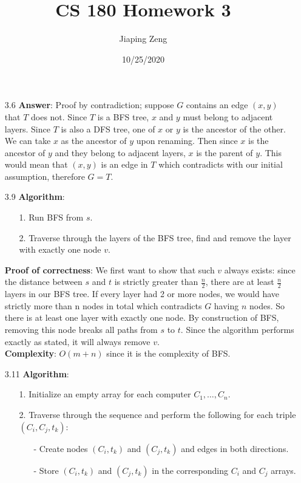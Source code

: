 \documentclass{article}
\title{CS 180 Homework 3}
\date{10/25/2020}
\author{Jiaping Zeng}
\begin{document}

\begin{itemize}
    \item [3.6]
          \textbf{Answer}: Proof by contradiction; suppose $G$ contains an edge $(x,y)$ that $T$ does not. Since $T$ is a BFS tree, $x$ and $y$ must belong to adjacent layers. Since $T$ is also a DFS tree, one of $x$ or $y$ is the ancestor of the other. We can take $x$ as the ancestor of $y$ upon renaming. Then since $x$ is the ancestor of $y$ and they belong to adjacent layers, $x$ is the parent of $y$. This would mean that $(x,y)$ is an edge in $T$ which contradicts with our initial assumption, therefore $G=T$.
    \item [3.9]
          \textbf{Algorithm}:
          \begin{itemize}
              \item [1.] Run BFS from $s$.
              \item [2.] Traverse through the layers of the BFS tree, find and remove the layer with exactly one node $v$.
          \end{itemize}
          \textbf{Proof of correctness}: We first want to show that such $v$ always exists: since the distance between $s$ and $t$ is strictly greater than $\frac{n}{2}$, there are at least $\frac{n}{2}$ layers in our BFS tree. If every layer had 2 or more nodes, we would have strictly more than n nodes in total which contradicts $G$ having $n$ nodes. So there is at least one layer with exactly one node. By construction of BFS, removing this node breaks all paths from $s$ to $t$. Since the algorithm performs exactly as stated, it will always remove $v$.\\
          \textbf{Complexity}: $O(m+n)$ since it is the complexity of BFS.
    \item [3.11]
          \textbf{Algorithm}:
          \begin{itemize}
              \item [1.] Initialize an empty array for each computer $C_1,\ldots,C_n$.
              \item [2.] Traverse through the sequence and perform the following for each triple $(C_i,C_j,t_k)$:
                    \begin{itemize}
                        \item [-] Create nodes $(C_i,t_k)$ and $(C_j,t_k)$ and edges in both directions.
                        \item [-] Store $(C_i,t_k)$ and $(C_j,t_k)$ in the corresponding $C_i$ and $C_j$ arrays.

\end{itemize}
\end{itemize}
\end{itemize}
\end{document}

